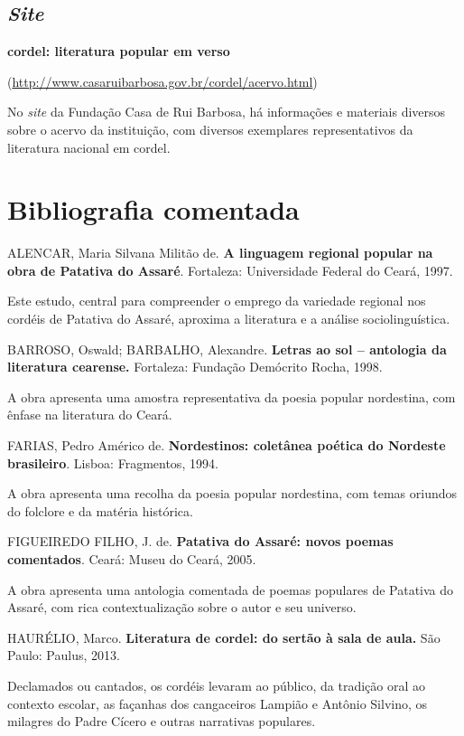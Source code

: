 \documentclass{extarticle}
\begin{document}
  \subsection{\emph{Site}}


\textbf{cordel: literatura popular em verso }

(\url{http://www.casaruibarbosa.gov.br/cordel/acervo.html})

No \emph{site} da Fundação Casa de Rui Barbosa, há informações e
materiais diversos sobre o acervo da instituição, com diversos
exemplares representativos da literatura nacional em cordel.

\section{Bibliografia comentada}


  ALENCAR, Maria Silvana Militão de. \textbf{A linguagem regional
  popular na obra de Patativa do Assaré}. Fortaleza: Universidade
  Federal do Ceará, 1997.

Este estudo, central para compreender o emprego da variedade regional
nos cordéis de Patativa do Assaré, aproxima a literatura e a análise
sociolinguística.


  BARROSO, Oswald; BARBALHO, Alexandre. \textbf{Letras ao sol --
  antologia da literatura cearense.} Fortaleza: Fundação Demócrito
  Rocha, 1998.

A obra apresenta uma amostra representativa da poesia popular
nordestina, com ênfase na literatura do Ceará.


  FARIAS, Pedro Américo de. \textbf{Nordestinos: coletânea poética do
  Nordeste brasileiro}. Lisboa: Fragmentos, 1994.

A obra apresenta uma recolha da poesia popular nordestina, com temas
oriundos do folclore e da matéria histórica.


  FIGUEIREDO FILHO, J. de. \textbf{Patativa do Assaré: novos poemas
  comentados}. Ceará: Museu do Ceará, 2005.

A obra apresenta uma antologia comentada de poemas populares de Patativa
do Assaré, com rica contextualização sobre o autor e seu universo.


  HAURÉLIO, Marco. \textbf{Literatura de cordel: do sertão à sala de
  aula.} São Paulo: Paulus, 2013.

Declamados ou cantados, os cordéis levaram ao público, da tradição oral
ao contexto escolar, as façanhas dos cangaceiros Lampião e Antônio
Silvino, os milagres do Padre Cícero e outras narrativas populares.
\end{document}
